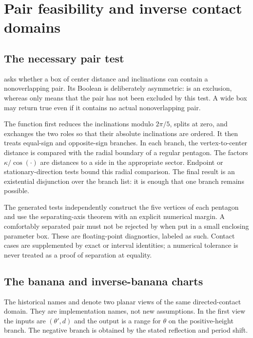 \documentclass[11pt,a4paper]{article}
\newcommand{\code}[1]{\texttt{\detokenize{#1}}}
\theoremstyle{remark}\newtheorem*{contract}{Implementation contract}\newtheorem*{auditnote}{Audit note}
\begin{document}
\section{Pair feasibility and inverse contact domains}

\subsection{The necessary pair test}
\code{Pet.pet} asks whether a box of center distance and inclinations can
contain a nonoverlapping pair. Its Boolean is deliberately asymmetric:
\code{false} is an exclusion, whereas \code{true} only means that the pair
has not been excluded by this test. A wide box may return true even if it
contains no actual nonoverlapping pair.

The function first reduces the inclinations modulo $2\pi/5$, splits at zero,
and exchanges the two roles so that their absolute inclinations are ordered.
It then treats equal-sign and opposite-sign branches. In each branch, the
vertex-to-center distance is compared with the radial boundary of a regular
pentagon. The factors $\kappa/\cos(\cdot)$ are distances to a side in the
appropriate sector. Endpoint or stationary-direction tests bound this radial
comparison. The final result is an existential disjunction over the branch
list: it is enough that one branch remains possible.



The generated tests independently construct the five vertices of each
pentagon and use the separating-axis theorem with an explicit numerical
margin. A comfortably separated pair must not be rejected by
\code{Pet.pet} when put in a small enclosing parameter box. These are
floating-point diagnostics, labeled as such. Contact cases are supplemented
by exact or interval identities; a numerical tolerance is never treated as a
proof of separation at equality.

\subsection{The banana and inverse-banana charts}
The historical names \code{banana} and \code{danana} denote two planar
views of the same directed-contact domain. They are implementation names,
not new assumptions. In the first view the inputs are $(\theta',d)$ and the
output is a range for $\theta$ on the positive-height branch. The negative
branch is obtained by the stated reflection and period shift.
\end{document}
